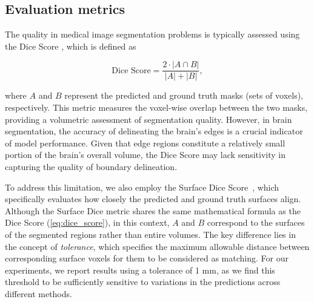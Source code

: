 


\subsection{Evaluation metrics}

The quality in medical image segmentation problems is typically assessed using the Dice Score \cite{bakas2018identifying}, which is defined as

\begin{equation}
	\label{eq:dice_score}
	\text{Dice Score} = \frac{2 \cdot |A \cap B|}{|A| + |B|},
\end{equation}

\noindent
where $A$ and $B$ represent the predicted and ground truth masks (sets of voxels), respectively. This metric measures the voxel-wise overlap between the two masks, providing a volumetric assessment of segmentation quality. However, in brain segmentation, the accuracy of delineating the brain's edges is a crucial indicator of model performance. Given that edge regions constitute a relatively small portion of the brain's overall volume, the Dice Score may lack sensitivity in capturing the quality of boundary delineation.

To address this limitation, we also employ the Surface Dice Score~\cite{nikolov2021clinically}, which specifically evaluates how closely the predicted and ground truth surfaces align. Although the Surface Dice metric shares the same mathematical formula as the Dice Score (\ref{eq:dice_score}), in this context, $A$ and $B$ correspond to the surfaces of the segmented regions rather than entire volumes. The key difference lies in the concept of \textit{tolerance}, which specifies the maximum allowable distance between corresponding surface voxels for them to be considered as matching. For our experiments, we report results using a tolerance of 1 mm, as we find this threshold to be sufficiently sensitive to variations in the predictions across different methods.

